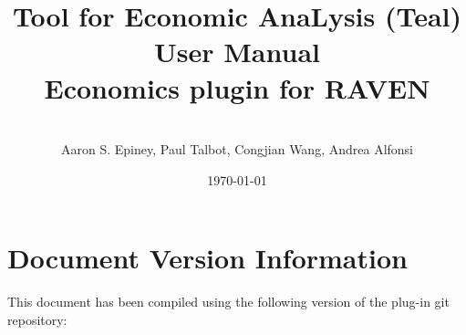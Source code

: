 \documentclass[pdf,12pt]{article}
\title{Tool for Economic AnaLysis (Teal) User Manual \\
        \large Economics plugin for RAVEN \\
}
\author{
 \\Aaron S. Epiney, Paul Talbot, Congjian Wang, Andrea Alfonsi\\
}
\date{\today}
\begin{document}
    \maketitle

    \cleardoublepage		%
    \tableofcontents

    

    

    \section*{Document Version Information}
    This document has been compiled using the following version of the plug-in git repository:
    \newline
    

    \clearpage
    \providecommand*{\phantomsection}{}
    \phantomsection
    
    


\end{document}
